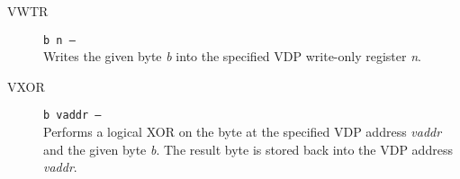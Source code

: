 \documentclass{article}
\begin{document}
\begin{multicols}{2}[]
\begin{description}
			\item[VWTR]\texttt{b n --- }\\
				Writes the given byte \textit{b} into the specified VDP write-only register
				\textit{n}.

			\item[VXOR]\texttt{b vaddr --- }\\
				Performs a logical XOR on the byte at the specified VDP address
				\textit{vaddr} and the given byte \textit{b}. The result byte is
				stored back into the VDP address \textit{vaddr}.
		\end{description}

	\end{multicols}
\end{document}
